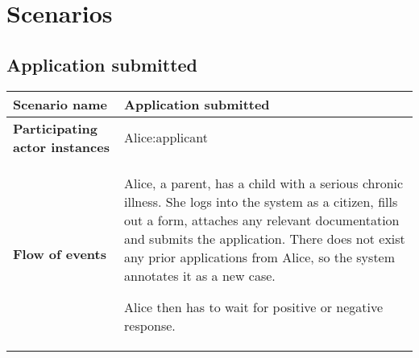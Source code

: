 \newpage
\section{Scenarios}

\subsection*{Application submitted}
\begin{table}[htb!]
\begin{tabularx}{\textwidth}{l|X}
	\textbf{Scenario name} & Application submitted \\
	\hline
	\textbf{Participating actor instances} & Alice:applicant\\
	\hline
	\textbf{Flow of events} &
	\begin{compactenum}
		\item Alice, a parent, has a child with a serious chronic illness. She logs into the system as a citizen, fills out a form, attaches any relevant documentation and submits the application. There does not exist any prior applications from Alice, so the system annotates it as a new case.
		\item Alice then has to wait for positive or negative response.
    \end{compactenum}\\
	\hline
\end{tabularx}
\end{table}

